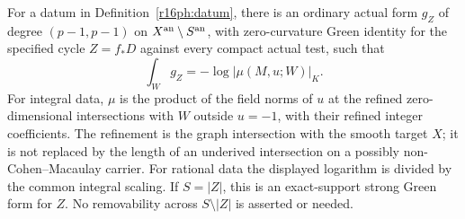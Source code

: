 \begin{proposition}
\label{r16ph:principal-push}
For a datum in Definition~\ref{r16ph:datum}, there is an ordinary
actual form $g_Z$ of degree $(p-1,p-1)$ on
$X^{\rm an}\setminus S^{\rm an}$, with zero-curvature Green
identity for the specified cycle $Z=f_*D$ against every compact
actual test, such that
\[
                \int_W g_Z=-\log|\mu(M,u;W)|_K.
 \tag{PH16.2}\label{r16ph:norm-evaluation}
\]
For integral data, $\mu$ is the product of the field norms of $u$
at the refined zero-dimensional intersections with $W$ outside
$u=-1$, with their refined integer coefficients.  The refinement
is the graph intersection with the smooth target $X$; it is not
replaced by the length of an underived intersection on a possibly
non-Cohen--Macaulay carrier.  For rational data the displayed
logarithm is divided by the common integral scaling.
If $S=|Z|$, this is an exact-support strong Green form for $Z$.
No removability across $S\setminus|Z|$ is asserted or needed.
\end{proposition}

